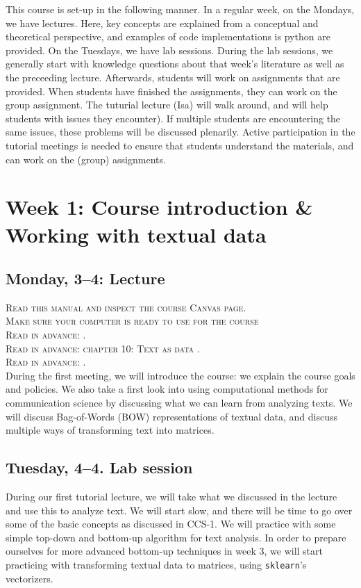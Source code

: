 This course is set-up in the following manner. In a regular week, on the Mondays, we have lectures. Here, key concepts are explained from a conceptual and theoretical perspective, and examples of code implementations is python are provided.  On the Tuesdays, we have lab sessions. During the lab sessions, we generally start with knowledge questions about that week's literature as well as the preceeding lecture. Afterwards, students will work on assignments that are provided. When students have finished the assignments, they can work on the group assignment. The tuturial lecture (Isa) will walk around, and will help students with issues they encounter). If multiple students are encountering the same issues, these problems will be discussed plenarily. Active participation in the tutorial meetings is needed to ensure that students understand the materials, and can work on the (group) assignments.

\section*{Week 1: Course introduction \& Working with textual data}

\subsection*{Monday, 3--4: Lecture}
\textsc{ Read this manual and inspect the course Canvas page.}\\
\textsc{ Make sure your computer is ready to use for the course }\\
\textsc{ Read in advance: \cite{Hirschenberg2015}.} \\
\textsc{Read in advance: chapter 10: Text as data \cite{van_atteveldt_computational_2022}.} \\
\textsc{Read in advance: \cite{Boumans2016}.} \\
During the first meeting, we will introduce the course: we explain the course goals and policies. We also take a first look into using computational methods for communication science by discussing what we can learn from analyzing texts.
We will discuss Bag-of-Words (BOW) representations of textual data, and discuss multiple ways of transforming text into matrices. 

\subsection*{Tuesday, 4--4. Lab session}
During our first tutorial lecture, we will take what we discussed in the lecture and use this to analyze text. We will start slow, and there will be time to go over some of the basic concepts as discussed in CCS-1.
We will practice with some simple top-down and bottom-up algorithm for text analysis. In order to prepare ourselves for more advanced bottom-up techniques in week 3, we will start practicing with transforming textual data to matrices, using  \texttt{sklearn}'s vectorizers. 


